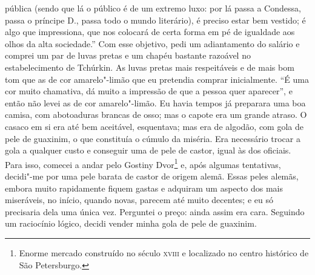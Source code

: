 pública (sendo que lá o público é de um extremo luxo: por lá passa a
Condessa, passa o príncipe D., passa todo o mundo literário), é preciso
estar bem vestido; é algo que impressiona, que nos colocará de certa
forma em pé de igualdade aos olhos da alta sociedade.” Com esse
objetivo, pedi um adiantamento do salário e comprei um par de luvas
pretas e um chapéu bastante razoável no estabelecimento de Tchúrkin. As
luvas pretas mais respeitáveis e de mais bom tom que as de cor
amarelo"-limão que eu pretendia comprar inicialmente. “É uma cor muito
chamativa, dá muito a impressão de que a pessoa quer aparecer”, e então
não levei as de cor amarelo"-limão. Eu havia tempos já preparara uma boa
camisa, com abotoaduras brancas de osso; mas o capote era um grande
atraso. O casaco em si era até bem aceitável, esquentava; mas era de
algodão, com gola de pele de guaxinim, o que constituía o cúmulo da
miséria. Era necessário trocar a gola a qualquer custo e conseguir uma
de pele de castor, igual às dos oficiais. Para isso, comecei a andar
pelo Gostiny Dvor\footnote{ Enorme mercado construído no século \textsc{xviii} e
localizado no centro histórico de São Petersburgo.} 
e, após algumas tentativas, decidi"-me por uma
pele barata de castor de origem alemã. Essas peles alemãs, embora muito
rapidamente fiquem gastas e adquiram um aspecto dos mais miseráveis, no
início, quando novas, parecem até muito decentes; e eu só precisaria
dela uma única vez. Perguntei o preço: ainda assim era cara. Seguindo
um raciocínio lógico, decidi vender minha gola de pele de guaxinim.

